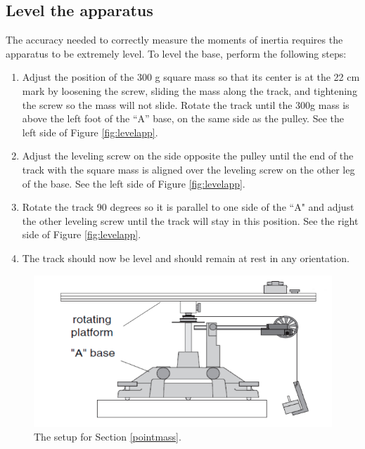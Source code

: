 \subsection{Level the apparatus}
The accuracy needed to correctly measure the moments of inertia requires the apparatus to be extremely level.  To level the base, perform the following steps:

\begin{enumerate}
	\item Adjust the position of the 300 g square mass so that its center is at the 22 cm mark by loosening the screw, sliding the mass along the track, and tightening the screw so the mass will not slide.  Rotate the track until the 300g mass is above the left foot of the ``A'' base, on the same side as the pulley. See the left side of Figure \ref{fig:levelapp}.
	\item Adjust the leveling screw on the side opposite the pulley until the end of the track with the square mass is aligned over the leveling screw on the other leg of the base. See the left side of Figure \ref{fig:levelapp}.
	\item Rotate the track 90 degrees so it is parallel to one side of the ``A" and adjust the other leveling screw until the track will stay in this position. See the right side of Figure \ref{fig:levelapp}.
	\item The track should now be level and should remain at rest in any orientation.
\end{enumerate}

\begin{figure}[b]
	\begin{center}
		\includegraphics[width=0.6\linewidth]{./Exp6/pic/rotplat.png}
	\end{center}
	\caption{The setup for Section \ref{pointmass}.}
	\label{fig:rotpoint}
\end{figure}

